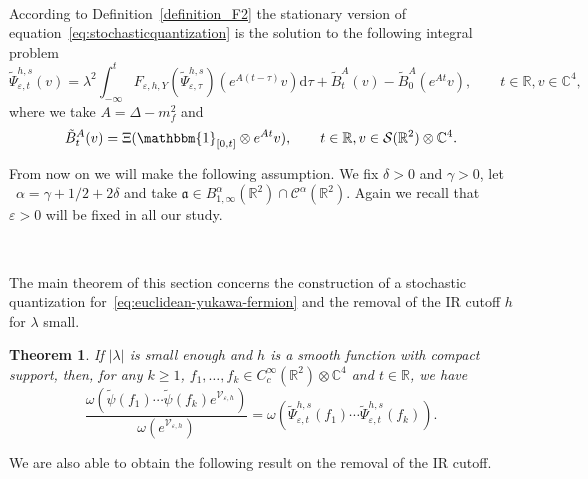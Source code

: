 \documentclass{article}
\newcommand{\mathd}{\mathrm{d}}
\newtheorem{theorem}{Theorem}
\begin{document}
\

According to Definition~\ref{definition_F2} the stationary version of
equation~{\eqref{eq:stochasticquantization}} is the solution to the following
integral problem
\begin{equation}
  \tilde{\Psi}^{h, s}_{\varepsilon, t} (v) = \lambda^2 \int_{- \infty}^t
  F_{\varepsilon, h, Y} (\tilde{\Psi}_{\varepsilon, \tau}^{h, s}) (e^{A (t -
  \tau)} v) \mathd \tau + \tilde{B}^A_t (v) - \tilde{B}^A_0 (e^{A t} v),
  \label{eq:yukawas} \qquad t \in \mathbb{R}, v \in \mathbb{C}^4,
\end{equation}
where we take $A = \Delta - m_f^2$ and
\[ \tilde{B}^A_t (v) = \Xi (\mathbbm{1}_{[0, t]} \otimes e^{A t} v), \qquad t
   \in \mathbb{R}, v \in \mathcal{S} (\mathbb{R}^2) \otimes \mathbb{C}^4 . \]


From now on we will make the following assumption. We fix $\delta > 0$ and
$\gamma > 0$, let \ $\alpha = \gamma + 1 / 2 + 2 \delta$ and take
$\mathfrak{a} \in B^{\alpha}_{1, \infty} (\mathbb{R}^2) \cap
\mathcal{C}^{\alpha} (\mathbb{R}^2)$. Again we recall that $\varepsilon > 0$
will be fixed in all our study.

\

The main theorem of this section concerns the construction of a stochastic
quantization for~{\eqref{eq:euclidean-yukawa-fermion}} and the removal of the
IR cutoff $h$ for $\lambda$ small.

\begin{theorem}
  \label{theorem_main1}If $| \lambda |$ is small enough and $h$ is a smooth
  function with compact support, then, for any $k \geqslant 1$, $f_1, \ldots,
  f_k \in C^{\infty}_c (\mathbb{R}^2) \otimes \mathbb{C}^4$ and $t \in
  \mathbb{R}$, we have
  \begin{equation}
    \frac{\omega (\tilde{\psi} (f_1) \cdots \tilde{\psi} (f_k)
    e^{\mathcal{V}_{\varepsilon, h}})}{\omega (e^{\mathcal{V}_{\varepsilon,
    h}})} = \omega (\tilde{\Psi}_{\varepsilon, t}^{h, s} (f_1) \cdots
    \tilde{\Psi}_{\varepsilon, t}^{h, s} (f_k)) .
  \end{equation}
\end{theorem}

We are also able to obtain the following result on the removal of the IR
cutoff.
\end{document}
